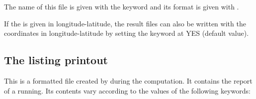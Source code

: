 The name of this file is given with the keyword 
and its format is given with .

If the  is given in longitude-latitude, the result files
can also be written with the coordinates in longitude-latitude
by setting the keyword 
at YES (default value).

\subsection{The listing printout}

This is a formatted file created by  during the computation.
It contains the report of a  running.
Its contents vary according to the values of the following keywords:

